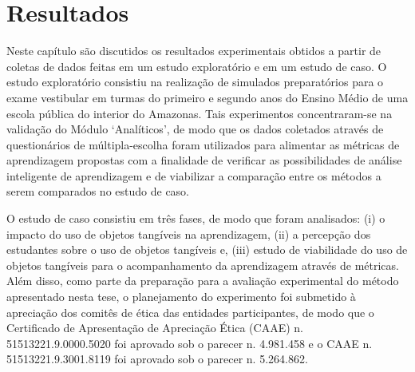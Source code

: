 
\chapter{Resultados} \label{Chap:Results}

Neste capítulo são discutidos os resultados experimentais obtidos a partir de coletas de dados feitas em um estudo exploratório e em um estudo de caso. O estudo exploratório consistiu na realização de simulados preparatórios para o exame vestibular em turmas do primeiro e segundo anos do Ensino Médio de uma escola pública do interior do Amazonas. Tais experimentos concentraram-se na validação do Módulo `Analíticos', de modo que os dados coletados através de questionários de múltipla-escolha foram utilizados para alimentar as métricas de aprendizagem propostas com a finalidade de verificar as possibilidades de análise inteligente de aprendizagem e de viabilizar a comparação entre os métodos a serem comparados no estudo de caso.

O estudo de caso consistiu em três fases, de modo que foram analisados: (i) o impacto do uso de objetos tangíveis na aprendizagem, (ii) a percepção dos estudantes sobre o uso de objetos tangíveis e, (iii) estudo de viabilidade do uso de objetos tangíveis para o acompanhamento da aprendizagem através de métricas. Além disso, como parte da preparação para a avaliação experimental do método apresentado nesta tese, o planejamento do experimento foi submetido à apreciação dos comitês de ética das entidades participantes, de modo que o Certificado de Apresentação de Apreciação Ética (CAAE) n. 51513221.9.0000.5020 foi aprovado sob o parecer n. 4.981.458 e o CAAE n. 51513221.9.3001.8119 foi aprovado sob o parecer n. 5.264.862.




